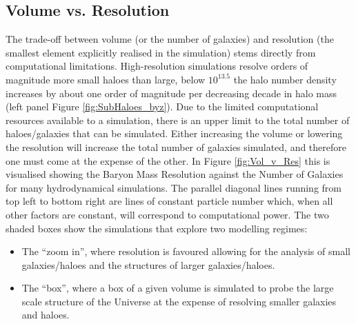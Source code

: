 \subsection{Volume vs. Resolution}
The trade-off between volume (or the number of galaxies) and resolution (the smallest element explicitly realised in the simulation) stems directly from computational limitations. High-resolution simulations resolve orders of magnitude more small haloes than large, below $10^{13.5}$ the halo number density increases by about one order of magnitude per decreasing decade in halo mass (left panel Figure \ref{fig:SubHaloes_byz}). Due to the limited computational resources available to a simulation, there is an upper limit to the total number of haloes/galaxies that can be simulated. Either increasing the volume or lowering the resolution will increase the total number of galaxies simulated, and therefore one must come at the expense of the other. In Figure \ref{fig:Vol_v_Res} this is visualised showing the Baryon Mass Resolution against the Number of Galaxies for many hydrodynamical simulations. The parallel diagonal lines running from top left to bottom right are lines of constant particle number which, when all other factors are constant, will correspond to computational power. The two shaded boxes show the simulations that explore two modelling regimes:
\begin{itemize}
    \item The ``zoom in'', where resolution is favoured allowing for the analysis of small galaxies/haloes and the structures of larger galaxies/haloes.
    \item The ``box'', where a box of a given volume is simulated to probe the large scale structure of the Universe at the expense of resolving smaller galaxies and haloes.
\end{itemize}

